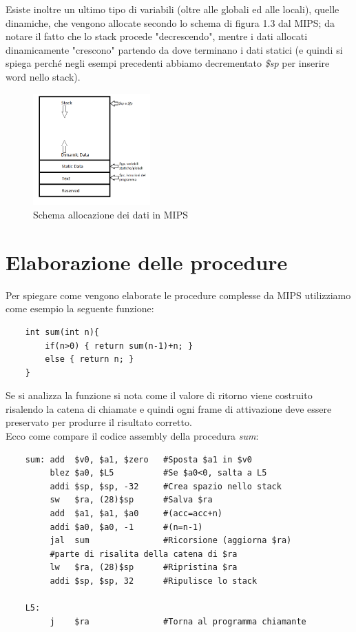 \documentclass[class=book, crop=false]{standalone}
\begin{document}
Esiste inoltre un ultimo tipo di variabili (oltre alle globali ed alle locali), quelle dinamiche, che vengono allocate secondo lo schema di figura 1.3 dal MIPS; da notare il fatto che lo stack procede "decrescendo", mentre i dati allocati dinamicamente "crescono"  partendo da dove terminano i dati statici (e quindi si spiega perché negli esempi precedenti abbiamo decrementato \emph{\$sp} per inserire word nello stack).
\begin{figure}[H]
	\centering
	\caption{Schema allocazione dei dati in MIPS}
	\includegraphics[width=0.4\textwidth,keepaspectratio]{Dove-finiscono-le-variabili}
\end{figure}

\section{Elaborazione delle procedure}
Per spiegare come vengono elaborate le procedure complesse da MIPS utilizziamo come esempio la seguente funzione:

\begin{verbatim}
	int sum(int n){
		if(n>0) { return sum(n-1)+n; }
		else { return n; }
	}
\end{verbatim}

Se si analizza la funzione si nota come il valore di ritorno viene costruito risalendo la catena di chiamate e quindi ogni frame di attivazione deve essere preservato per produrre il risultato corretto.\\
Ecco come compare il codice assembly della procedura \emph{sum}:

\begin{verbatim}
	sum: add  $v0, $a1, $zero   #Sposta $a1 in $v0
	     blez $a0, $L5          #Se $a0<0, salta a L5
	     addi $sp, $sp, -32     #Crea spazio nello stack
	     sw   $ra, (28)$sp      #Salva $ra
	     add  $a1, $a1, $a0     #(acc=acc+n)
	     addi $a0, $a0, -1      #(n=n-1)
	     jal  sum               #Ricorsione (aggiorna $ra)
	     #parte di risalita della catena di $ra
	     lw   $ra, (28)$sp      #Ripristina $ra
	     addi $sp, $sp, 32      #Ripulisce lo stack

	L5:
	     j    $ra               #Torna al programma chiamante


\end{verbatim}
\end{document}
